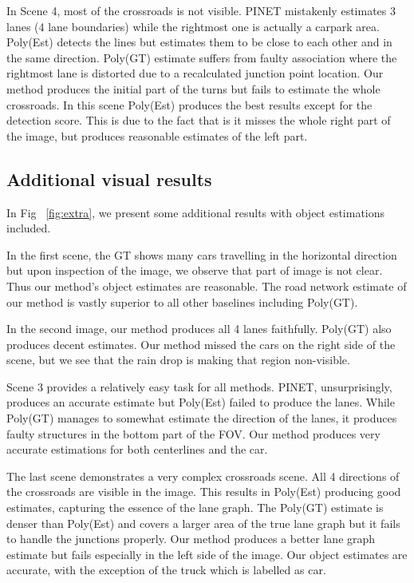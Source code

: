 \documentclass[10pt,twocolumn,letterpaper]{article}
\begin{document}
In Scene 4, most of the crossroads is not visible. PINET mistakenly estimates 3 lanes (4 lane boundaries) while the rightmost one is actually a carpark area. Poly(Est) detects the lines but estimates them to be close to each other and in the same direction. Poly(GT) estimate suffers from faulty association where the rightmost lane is distorted due to a recalculated junction point location. Our method produces the initial part of the turns but fails to estimate the whole crossroads. In this scene Poly(Est) produces the best results except for the detection score. This is due to the fact that is it misses the whole right part of the image, but produces reasonable estimates of the left part.


\subsection{Additional visual results}
In Fig ~\ref{fig:extra}, we present some additional results with object estimations included. 

In the first scene, the GT shows many cars travelling in the horizontal direction but upon inspection of the image, we observe that part of image is not clear. Thus our method's object estimates are reasonable. The road network estimate of our method is vastly superior to all other baselines including Poly(GT). 

In the second image, our method produces all 4 lanes faithfully. Poly(GT) also produces decent estimates. Our method missed the cars on the right side of the scene, but we see that the rain drop is making that region non-visible. 

Scene 3 provides a relatively easy task for all methods. PINET, unsurprisingly, produces an accurate estimate but Poly(Est) failed to produce the lanes. While Poly(GT) manages to somewhat estimate the direction of the lanes, it produces faulty structures in the bottom part of the FOV. Our method produces very accurate estimations for both centerlines and the car.

The last scene demonstrates a very complex crossroads scene. All 4 directions of the crossroads are visible in the image. This results in Poly(Est) producing good estimates, capturing the essence of the lane graph. The Poly(GT) estimate is denser than Poly(Est) and covers a larger area of the true lane graph but it fails to handle the junctions properly. Our method produces a better lane graph estimate but fails especially in the left side of the image. Our object estimates are accurate, with the exception of the truck which is labelled as car.  
\end{document}
